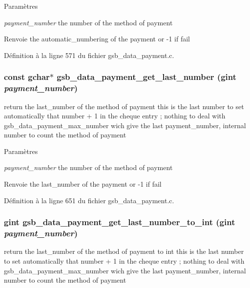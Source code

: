 \begin{DoxyParams}{Paramètres}
\item[{\em payment\_\-number}]the number of the method of payment\end{DoxyParams}
\begin{DoxyReturn}{Renvoie}
the automatic\_\-numbering of the payment or -\/1 if fail 
\end{DoxyReturn}


Définition à la ligne 571 du fichier gsb\_\-data\_\-payment.c.

\subsubsection[{gsb\_\-data\_\-payment\_\-get\_\-last\_\-number}]{\setlength{\rightskip}{0pt plus 5cm}const gchar$\ast$ gsb\_\-data\_\-payment\_\-get\_\-last\_\-number (gint {\em payment\_\-number})}\label{gsb__data__payment_8c_a2e5d8517394a5d0685cfae13ff906f1b}
return the last\_\-number of the method of payment this is the last number to set automatically that number + 1 in the cheque entry ; nothing to deal with gsb\_\-data\_\-payment\_\-max\_\-number wich give the last payment\_\-number, internal number to count the method of payment


\begin{DoxyParams}{Paramètres}
\item[{\em payment\_\-number}]the number of the method of payment\end{DoxyParams}
\begin{DoxyReturn}{Renvoie}
the last\_\-number of the payment or -\/1 if fail 
\end{DoxyReturn}


Définition à la ligne 651 du fichier gsb\_\-data\_\-payment.c.

\subsubsection[{gsb\_\-data\_\-payment\_\-get\_\-last\_\-number\_\-to\_\-int}]{\setlength{\rightskip}{0pt plus 5cm}gint gsb\_\-data\_\-payment\_\-get\_\-last\_\-number\_\-to\_\-int (gint {\em payment\_\-number})}\label{gsb__data__payment_8c_a420ad8a019ad5a7f5578c17752339de9}
return the last\_\-number of the method of payment to int this is the last number to set automatically that number + 1 in the cheque entry ; nothing to deal with gsb\_\-data\_\-payment\_\-max\_\-number wich give the last payment\_\-number, internal number to count the method of payment


